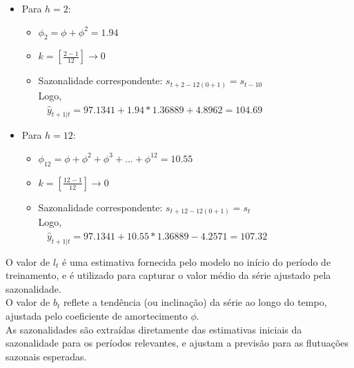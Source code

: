 \documentclass[a4paper, 12pt]{article}
\begin{document}
\begin{itemize}
    \item Para $h = 2$:
    \begin{itemize}
        \item $\phi_2 = \phi + \phi^2 = 1.94$
        \item $k = [\frac{2-1}{12}] \xrightarrow{} 0$
        \item Sazonalidade correspondente: $s_{t+2-12(0+1)} = s_{t-10}$\\
        
        Logo,\\

        $\>\ \>\ \hat y_{t+1|t} = 97.1341 + 1.94 * 1.36889 + 4.8962 = 104.69$
    \end{itemize} 
\end{itemize}

\begin{itemize}
    \item Para $h = 12$:
    \begin{itemize}
        \item $\phi_{12} = \phi + \phi^2 + \phi^3 + ... + \phi^{12} = 10.55$
        \item $k = [\frac{12-1}{12}] \xrightarrow{} 0$
        \item Sazonalidade correspondente: $s_{t+12-12(0+1)} = s_{t}$\\
        
        Logo,\\

        $\>\ \>\ \hat y_{t+1|t} = 97.1341 + 10.55 * 1.36889 - 4.2571 = 107.32$
    \end{itemize} 
\end{itemize}

O valor de $l_t$ é uma estimativa fornecida pelo modelo no início do período de treinamento, e é utilizado para capturar o valor médio da série ajustado pela sazonalidade.\\

O valor de $b_t$ reflete a tendência (ou inclinação) da série ao longo do tempo, ajustada pelo coeficiente de amortecimento $\phi$.\\

As sazonalidades são extraídas diretamente das estimativas iniciais da sazonalidade para os períodos relevantes, e ajustam a previsão para as flutuações sazonais esperadas.\\\\\\
\end{document}
